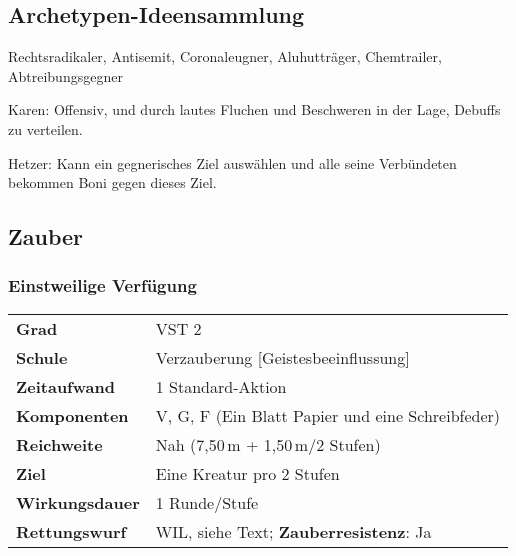 \documentclass[
	ngerman,
	a4paper,
	11pt,
	twocolumn,
]{scrartcl}
\begin{document}
\subsection*{Archetypen-Ideensammlung}

Rechtsradikaler, Antisemit, Coronaleugner, Aluhutträger, Chemtrailer, Abtreibungsgegner

Karen: Offensiv, und durch lautes Fluchen und Beschweren in der Lage, Debuffs zu verteilen.

Hetzer: Kann ein gegnerisches Ziel auswählen und alle seine Verbündeten bekommen Boni gegen dieses Ziel.



\subsection*{Zauber}

\onecolumn

	\subsubsection*{Einstweilige Verfügung}
	
	\begin{tabular}{p{}p{}}
		\textbf{Grad}				&VST 2	\\
		\textbf{Schule}				&Verzauberung [Geistesbeeinflussung]	\\
		\textbf{Zeitaufwand}		&1 Standard-Aktion	\\
		\textbf{Komponenten}		&V, G, F (Ein Blatt Papier und eine Schreibfeder)	\\
		\textbf{Reichweite}			&Nah (7,50\,m + 1,50\,m/2 Stufen)	\\
		\textbf{Ziel}				&Eine Kreatur pro 2 Stufen	\\
		\textbf{Wirkungsdauer}		&1 Runde/Stufe	\\
		\textbf{Rettungswurf}		&WIL, siehe Text; \textbf{Zauberresistenz}: Ja	\\
	\end{tabular}
	
\end{document}
